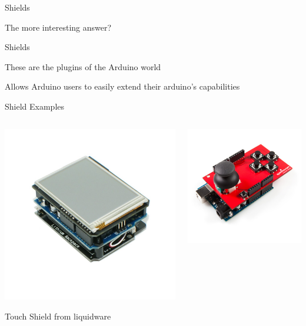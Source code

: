 \documentclass{beamer}
\begin{document}
\begin{frame}{Shields}
  \centerline{The more interesting answer?}
  \pause
  \centerline{Shields}
  \centerline{These are the plugins of the Arduino world}
  \centerline{Allows Arduino users to easily extend their arduino's capabilities}
\end{frame}

\begin{frame}{Shield Examples}
  \begin{columns}
    \pause
    \begin{column}{0.5\textwidth}
      \centerline{\includegraphics[width=.95\textwidth]{touch_shield.jpg}}
      \centerline{Touch Shield from liquidware}
    \end{column}
    \begin{column}{0.5\textwidth}
      \centerline{\includegraphics[width=.95\textwidth]{joystick-shield.jpg}}

\end{column}
\end{columns}
\end{frame}
\end{document}
